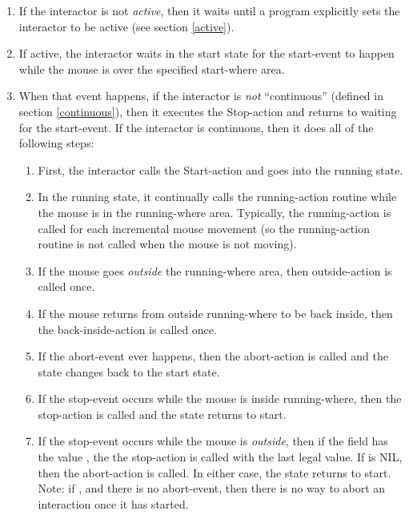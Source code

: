 \begin{enumerate}
\item If the interactor is not {\it active}, then it waits until a program
explicitly sets the interactor to be active (see section \ref{active}).

\item If active, the interactor waits in the start state for the start-event to
happen while the mouse is over the specified start-where area.

\item When that event happens, if the interactor is {\it not} ``continuous''
(defined in section \ref{continuous}), then it executes the Stop-action
and returns to waiting for the start-event.  If the interactor is
continuous, then it does all of the following steps:
\begin{enumerate}
\item First, the interactor calls the Start-action and goes into the running state.

\item In the running state, it continually calls the running-action routine while
the mouse is in the running-where area.  Typically, the running-action is
called for each incremental mouse movement (so the running-action routine
is not called when the mouse is not moving).

\item If the mouse goes {\it outside} the
running-where area, then outside-action is called once.

\item If the mouse returns from outside running-where to be back inside, then the
back-inside-action is called once.

\item If the abort-event ever happens, then the abort-action is called and the
state changes back to the start state.

\item If the stop-event occurs while the mouse is inside running-where, then the
stop-action is called and the state returns to start.

\item If the stop-event occurs while the mouse is {\it outside}, then if the
 field has the value , the the stop-action is called
with the last legal value.  If  is NIL, then the
abort-action is called.  In either case, the state returns to start.
Note: if , and there is no abort-event, then there is
no way to abort an interaction once it has started.
\end{enumerate}
\end{enumerate}

